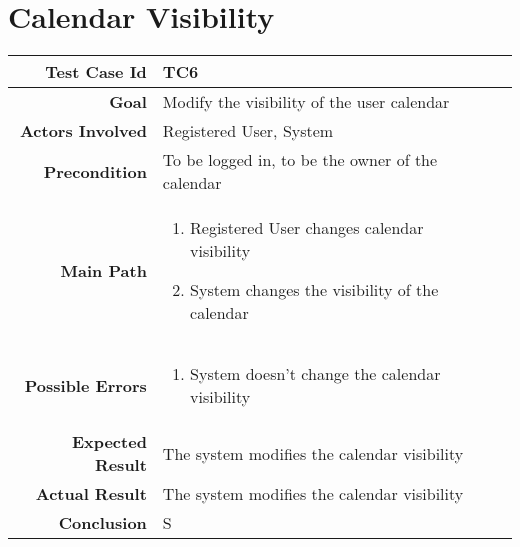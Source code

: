 \section{Calendar Visibility}
\begin{tabularx}{\linewidth}{|r|X|X|}
\hline   {\bf Test Case Id} &  TC6\\
  \hline  {\bf Goal} & Modify the visibility of the user calendar\\
  \hline  {\bf Actors Involved} & Registered User, System\\
  \hline  {\bf Precondition} & To be logged in, to be the owner of the calendar\\ 
   \hline  {\bf Main Path} & \begin{enumerate} 
   \item Registered User changes calendar visibility
    \item System changes the visibility of the calendar
   \end{enumerate}\\
   \hline  {\bf Possible Errors} & \begin{enumerate} 
   \item System doesn't change the calendar visibility
   \end{enumerate}\\
  \hline  {\bf Expected Result} & The system modifies the calendar visibility\\
  \hline  {\bf Actual Result} & The system modifies the calendar visibility\\
  \hline  {\bf Conclusion} & S\\
  \hline
  
\end{tabularx}



